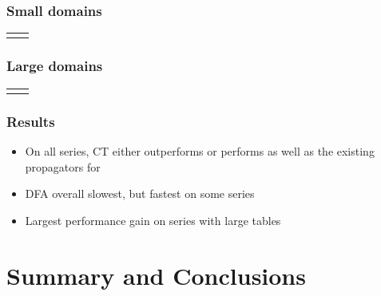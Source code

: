 \documentclass{beamer}
\newcommand{\Table}{\Constraint{Table}}
\begin{document}
\begin{frame}
  \frametitle{Small domains}
  \begin{tabular}{cc}
    \begin{tikzpicture}[scale=0.5]
      
    \end{tikzpicture}
    &
      \begin{tikzpicture}[scale=0.5]
        
      \end{tikzpicture} \\
    \end{tabular}
\end{frame}

\begin{frame}
  \frametitle{Large domains}
  \begin{tabular}{cc}
    \begin{tikzpicture}[scale=0.5]
      
    \end{tikzpicture}
    &
      \begin{tikzpicture}[scale=0.5]
        
      \end{tikzpicture} \\
  \end{tabular}
\end{frame}

\begin{frame}
  \frametitle{Results}
  \begin{itemize}
    \item On all series, CT either outperforms or performs as well as the existing
      propagators for~\Table
    \item DFA overall slowest, but fastest on some series
    \item Largest performance gain on series with large tables
  \end{itemize}
\end{frame}

\section{Summary and Conclusions}
\end{document}
